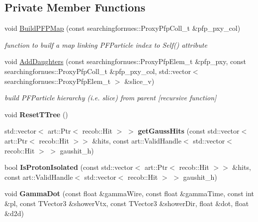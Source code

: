 \subsection*{Private Member Functions}
\begin{DoxyCompactItemize}
\item 
void \hyperlink{classSecondShowerPurity_a740e87a9a228f255bca15d2f04505aa9}{Build\+P\+F\+P\+Map} (const searchingfornues\+::\+Proxy\+Pfp\+Coll\+\_\+t \&pfp\+\_\+pxy\+\_\+col)
\begin{DoxyCompactList}\small\item\em function to builf a map linking P\+F\+Particle index to Self() attribute \end{DoxyCompactList}\item 
void \hyperlink{classSecondShowerPurity_a91a362195490bc158713e4ed84ed0fa2}{Add\+Daughters} (const searchingfornues\+::\+Proxy\+Pfp\+Elem\+\_\+t \&pfp\+\_\+pxy, const searchingfornues\+::\+Proxy\+Pfp\+Coll\+\_\+t \&pfp\+\_\+pxy\+\_\+col, std\+::vector$<$ searchingfornues\+::\+Proxy\+Pfp\+Elem\+\_\+t $>$ \&slice\+\_\+v)
\begin{DoxyCompactList}\small\item\em build P\+F\+Particle hierarchy (i.\+e. slice) from parent \mbox{[}recursive function\mbox{]} \end{DoxyCompactList}\item 
void {\bfseries Reset\+T\+Tree} ()\hypertarget{classSecondShowerPurity_af58098493a2cd9014e1e962b366008e3}{}\label{classSecondShowerPurity_af58098493a2cd9014e1e962b366008e3}

\item 
std\+::vector$<$ art\+::\+Ptr$<$ recob\+::\+Hit $>$ $>$ {\bfseries get\+Gauss\+Hits} (const std\+::vector$<$ art\+::\+Ptr$<$ recob\+::\+Hit $>$$>$ \&hits, const art\+::\+Valid\+Handle$<$ std\+::vector$<$ recob\+::\+Hit $>$ $>$ gaushit\+\_\+h)\hypertarget{classSecondShowerPurity_ad2c997fc6ccdea277c14cfcad5c83243}{}\label{classSecondShowerPurity_ad2c997fc6ccdea277c14cfcad5c83243}

\item 
bool {\bfseries Is\+Proton\+Isolated} (const std\+::vector$<$ art\+::\+Ptr$<$ recob\+::\+Hit $>$$>$ \&hits, const art\+::\+Valid\+Handle$<$ std\+::vector$<$ recob\+::\+Hit $>$ $>$ gaushit\+\_\+h)\hypertarget{classSecondShowerPurity_aca45d8671bf9d292eed1ed00a80329b1}{}\label{classSecondShowerPurity_aca45d8671bf9d292eed1ed00a80329b1}

\item 
void {\bfseries Gamma\+Dot} (const float \&gamma\+Wire, const float \&gamma\+Time, const int \&pl, const T\+Vector3 \&shower\+Vtx, const T\+Vector3 \&shower\+Dir, float \&dot, float \&d2d)\hypertarget{classSecondShowerPurity_ac3aa736b52623968b984814ac75d6510}{}\label{classSecondShowerPurity_ac3aa736b52623968b984814ac75d6510}


\end{DoxyCompactItemize}

